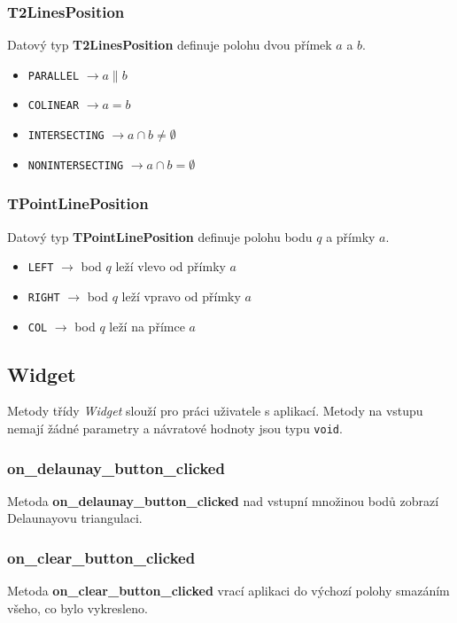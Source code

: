 \documentclass[a4paper, 12pt]{article}
\begin{document}
\subsubsection*{T2LinesPosition}
Datový typ \textbf{T2LinesPosition} definuje polohu dvou přímek $a$ a $b$.\\  
\begin{itemize}
\item \texttt{PARALLEL} $\rightarrow a \parallel b$
\item \texttt{COLINEAR} $\rightarrow a = b$
\item \texttt{INTERSECTING} $\rightarrow a \cap b \neq \emptyset$
\item \texttt{NONINTERSECTING} $\rightarrow a \cap b = \emptyset$
\end{itemize}

\subsubsection*{TPointLinePosition}
Datový typ \textbf{TPointLinePosition} definuje polohu bodu $q$ a přímky $a$.\\   
\begin{itemize}
\item \texttt{LEFT} $\rightarrow$ bod $q$ leží vlevo od přímky $a$
\item \texttt{RIGHT} $\rightarrow$ bod $q$ leží vpravo od přímky $a$
\item \texttt{COL} $\rightarrow$ bod $q$ leží na přímce $a$
\end{itemize}




\subsection{Widget}
Metody třídy \textit{Widget} slouží pro práci uživatele s aplikací. Metody na vstupu nemají žádné parametry a návratové hodnoty jsou typu \texttt{void}.

\subsubsection*{on\_delaunay\_button\_clicked}
Metoda \textbf{on\_delaunay\_button\_clicked} nad vstupní množinou bodů zobrazí Delaunayovu triangulaci. 

\subsubsection*{on\_clear\_button\_clicked}
Metoda \textbf{on\_clear\_button\_clicked} vrací aplikaci do výchozí polohy smazáním všeho, co bylo vykresleno. 
\end{document}
